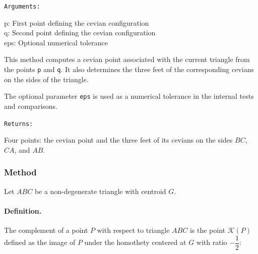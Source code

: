 \medskip

\texttt{Arguments: }

p: First point defining the cevian configuration \\
q: Second point defining the cevian configuration \\
eps: Optional numerical tolerance \\


\medskip

This method computes a cevian point associated with the current triangle from
the points \texttt{p} and \texttt{q}. It also determines the three feet of the
corresponding cevians on the sides of the triangle.

The optional parameter \texttt{eps} is used as a numerical tolerance in the
internal tests and comparisons.

\medskip

\texttt{Returns: }

Four points: the cevian point and the three feet of its cevians on the sides
$BC$, $CA$, and $AB$.


\begin{tkzexample}[latex=.5\textwidth]
\begin{center}
\end{center}
\end{tkzexample}



\subsubsection{Method }
\label{ssub:complement}

Let $ABC$ be a non-degenerate triangle with centroid $G$.

\paragraph{Definition.}
The complement of a point $P$ with respect to triangle $ABC$ is the point $\mathcal{K}(P)$ defined as the image of $P$ under the homothety centered at $G$ with ratio $-\dfrac{1}{2}$:

